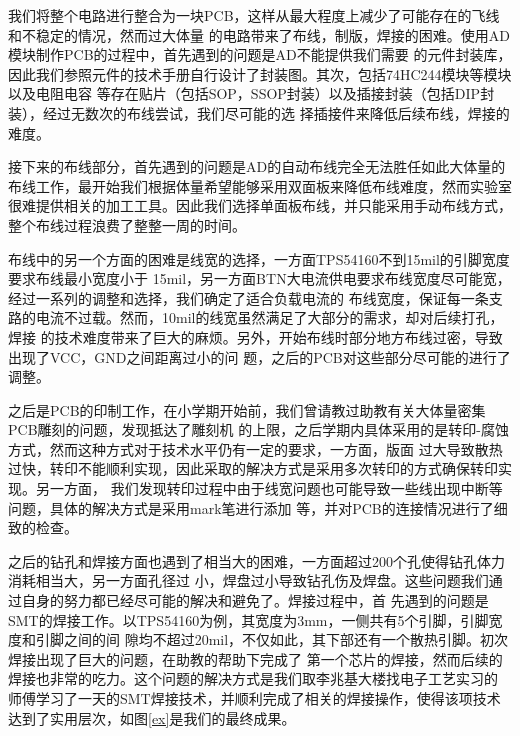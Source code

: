 \documentclass[a4paper]{paper}
\begin{document}
我们将整个电路进行整合为一块PCB，这样从最大程度上减少了可能存在的飞线和不稳定的情况，然而过大体量
的电路带来了布线，制版，焊接的困难。使用AD模块制作PCB的过程中，首先遇到的问题是AD不能提供我们需要
的元件封装库，因此我们参照元件的技术手册自行设计了封装图。其次，包括74HC244模块等模块以及电阻电容
等存在贴片（包括SOP，SSOP封装）以及插接封装（包括DIP封装），经过无数次的布线尝试，我们尽可能的选
择插接件来降低后续布线，焊接的难度。

接下来的布线部分，首先遇到的问题是AD的自动布线完全无法胜任如此大体量的布线工作，最开始我们根据体量希望能够采用双面板来降低布线难度，然而实验室很难提供相关的加工工具。因此我们选择单面板布线，并只能采用手动布线方式，整个布线过程浪费了整整一周的时间。

布线中的另一个方面的困难是线宽的选择，一方面TPS54160不到15mil的引脚宽度要求布线最小宽度小于
15mil，另一方面BTN大电流供电要求布线宽度尽可能宽，经过一系列的调整和选择，我们确定了适合负载电流的
布线宽度，保证每一条支路的电流不过载。然而，10mil的线宽虽然满足了大部分的需求，却对后续打孔，焊接
的技术难度带来了巨大的麻烦。另外，开始布线时部分地方布线过密，导致出现了VCC，GND之间距离过小的问
题，之后的PCB对这些部分尽可能的进行了调整。

之后是PCB的印制工作，在小学期开始前，我们曾请教过助教有关大体量密集PCB雕刻的问题，发现抵达了雕刻机
的上限，之后学期内具体采用的是转印-腐蚀方式，然而这种方式对于技术水平仍有一定的要求，一方面，版面
过大导致散热过快，转印不能顺利实现，因此采取的解决方式是采用多次转印的方式确保转印实现。另一方面，
我们发现转印过程中由于线宽问题也可能导致一些线出现中断等问题，具体的解决方式是采用mark笔进行添加
等，并对PCB的连接情况进行了细致的检查。

之后的钻孔和焊接方面也遇到了相当大的困难，一方面超过200个孔使得钻孔体力消耗相当大，另一方面孔径过
小，焊盘过小导致钻孔伤及焊盘。这些问题我们通过自身的努力都已经尽可能的解决和避免了。焊接过程中，首
先遇到的问题是SMT的焊接工作。以TPS54160为例，其宽度为3mm，一侧共有5个引脚，引脚宽度和引脚之间的间
隙均不超过20mil，不仅如此，其下部还有一个散热引脚。初次焊接出现了巨大的问题，在助教的帮助下完成了
第一个芯片的焊接，然而后续的焊接也非常的吃力。这个问题的解决方式是我们取李兆基大楼找电子工艺实习的
师傅学习了一天的SMT焊接技术，并顺利完成了相关的焊接操作，使得该项技术达到了实用层次，如图\ref{ex}是我们的最终成果。
\end{document}
